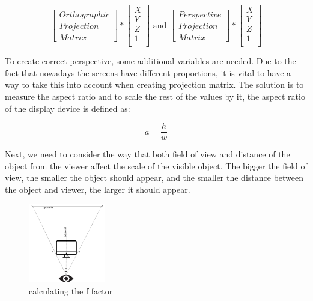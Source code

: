 \begin{equation}
\begin{bmatrix}
Orthographic\\
Projection \\
Matrix
\end{bmatrix} 
*
\begin{bmatrix}
X\\
Y\\
Z\\
1\\
\end{bmatrix} 
\text{ and }
\begin{bmatrix}
Perspective\\
Projection \\
Matrix
\end{bmatrix} 
*
\begin{bmatrix}
X\\
Y\\
Z\\
1\\
\end{bmatrix}
\label{projectionmatrices}
\end{equation}

To create correct perspective, some additional variables are needed. Due to the fact that nowadays the screens have different proportions, it is vital to have a way to take this into account when creating projection matrix. The solution is to measure the aspect ratio and to scale the rest of the values by it, the aspect ratio of the display device is defined as:

\begin{equation}
a=\frac{h}{w}
\label{aequation}
\end{equation}

Next, we need to consider the way that both field of view and distance of the object from the viewer affect the scale of the visible object. The bigger the field of view, the smaller the object should appear, and the smaller the distance  between the object and viewer, the larger it should appear.
\begin{figure}[H]
  \begin{center}
  \includegraphics[width=0.3\textwidth]{figures/f_factor.png}  
  \end{center}
  \caption{calculating the f factor}
\end{figure}

